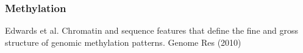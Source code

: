 \documentclass{beamer}
\begin{document}
\begin{frame}
	\frametitle{Methylation}
\tiny{Edwards et al. Chromatin and sequence features that define the fine and gross structure of genomic methylation patterns. Genome Res (2010)}
\end{frame}



\end{document}
